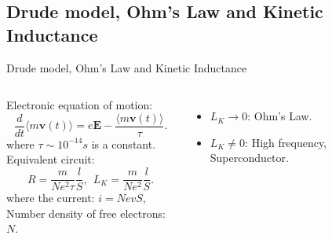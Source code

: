 \subsection{Drude model, Ohm's Law and Kinetic Inductance}

\begin{frame}{Drude model, Ohm's Law and Kinetic Inductance}

\begin{columns}
    Electronic equation of motion:
    \begin{equation*}
        \dfrac{d}{dt} \langle m \mathbf{v}(t) \rangle = e \mathbf{E} - \dfrac{ \langle m \mathbf{v}(t) \rangle}{\tau}.
    \end{equation*}
    where \( \tau \sim 10^{-14} \si{s} \) is a constant. \\
    Equivalent circuit:
    \begin{equation*}
        R = \dfrac{m}{N e^2 \tau} \dfrac{l}{S}, \ \ L_K = \dfrac{m}{N e^2} \dfrac{l}{S}.
    \end{equation*}
    where the current: \( i = N e v S\), \\
    Number density of free electrons: \(N\).

    \begin{itemize}
        \item \( L_K \rightarrow 0\): Ohm's Law.
        \item \( L_K \neq 0\): High frequency, Superconductor.
    \end{itemize}
    

\end{columns}
\end{frame}
